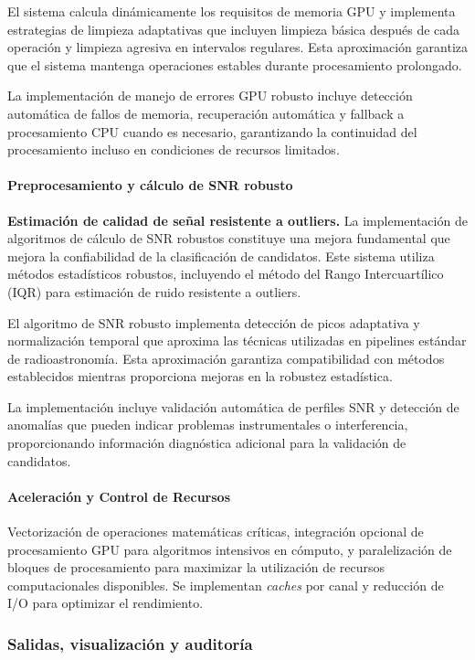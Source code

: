 El sistema calcula dinámicamente los requisitos de memoria GPU y implementa estrategias de limpieza adaptativas que incluyen limpieza básica después de cada operación y limpieza agresiva en intervalos regulares. Esta aproximación garantiza que el sistema mantenga operaciones estables durante procesamiento prolongado.

La implementación de manejo de errores GPU robusto incluye detección automática de fallos de memoria, recuperación automática y fallback a procesamiento CPU cuando es necesario, garantizando la continuidad del procesamiento incluso en condiciones de recursos limitados.

\paragraph{Preprocesamiento y cálculo de SNR robusto}

\noindent\textbf{Estimación de calidad de señal resistente a outliers.} La implementación de algoritmos de cálculo de SNR robustos constituye una mejora fundamental que mejora la confiabilidad de la clasificación de candidatos. Este sistema utiliza métodos estadísticos robustos, incluyendo el método del Rango Intercuartílico (IQR) para estimación de ruido resistente a outliers.

El algoritmo de SNR robusto implementa detección de picos adaptativa y normalización temporal que aproxima las técnicas utilizadas en pipelines estándar de radioastronomía. Esta aproximación garantiza compatibilidad con métodos establecidos mientras proporciona mejoras en la robustez estadística.

La implementación incluye validación automática de perfiles SNR y detección de anomalías que pueden indicar problemas instrumentales o interferencia, proporcionando información diagnóstica adicional para la validación de candidatos.

\paragraph{Aceleración y Control de Recursos}

Vectorización de operaciones matemáticas críticas, integración opcional de procesamiento GPU para algoritmos intensivos en cómputo, y paralelización de bloques de procesamiento para maximizar la utilización de recursos computacionales disponibles. Se implementan \textit{caches} por canal y reducción de I/O para optimizar el rendimiento.

\subsubsection{Salidas, visualización y auditoría}
